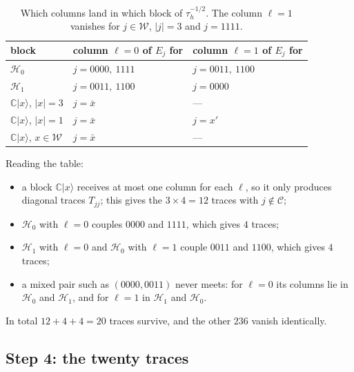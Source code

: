 \documentclass[11pt,a4paper]{article}
\theoremstyle{plain}
\newcommand{\ket}[1]{\lvert #1\rangle}
\newcommand{\C}{\mathbb{C}}
\newcommand{\cC}{\mathcal{C}}
\newcommand{\cW}{\mathcal{W}}
\newcommand{\cH}{\mathcal{H}}
\newcommand{\wt}[1]{\lvert #1\rvert}
\begin{document}
\begin{table}[ht]
\centering
\renewcommand{\arraystretch}{1.25}
\begin{tabular}{@{}lll@{}}
\toprule
block & column $\ell=0$ of $E_j$ for & column $\ell=1$ of $E_j$ for\\
\midrule
$\cH_0$ & $j=0000,\ 1111$ & $j=0011,\ 1100$\\
$\cH_1$ & $j=0011,\ 1100$ & $j=0000$\\
$\C\ket x$, $\wt{x}=3$ & $j=\bar x$ & ---\\
$\C\ket x$, $\wt{x}=1$ & $j=\bar x$ & $j=x'$\\
$\C\ket x$, $x\in\cW$ & $j=\bar x$ & ---\\
\bottomrule
\end{tabular}
\caption{Which columns land in which block of $\tau_h^{-1/2}$. The column $\ell=1$ vanishes for $j\in\cW$, $\wt{j}=3$ and $j=1111$.}
\label{tab:blocks}
\end{table}

Reading the table:
\begin{itemize}
  \item a block $\C\ket x$ receives at most one column for each $\ell$, so it only produces diagonal traces $T_{jj}$; this gives the $3\times 4=12$ traces with $j\notin\cC$;
  \item $\cH_0$ with $\ell=0$ couples $0000$ and $1111$, which gives $4$ traces;
  \item $\cH_1$ with $\ell=0$ and $\cH_0$ with $\ell=1$ couple $0011$ and $1100$, which gives $4$ traces;
  \item a mixed pair such as $(0000,0011)$ never meets: for $\ell=0$ its columns lie in $\cH_0$ and $\cH_1$, and for $\ell=1$ in $\cH_1$ and $\cH_0$.
\end{itemize}
In total $12+4+4=20$ traces survive, and the other $236$ vanish identically.


\subsection*{Step 4: the twenty traces}
\end{document}

